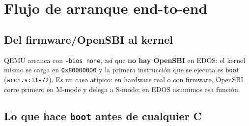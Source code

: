 \documentclass[11pt,a4paper]{article}
\begin{document}
\section{Flujo de arranque end-to-end}

\subsection{Del firmware/OpenSBI al kernel}

QEMU arranca con \texttt{-bios none}, así que \textbf{no hay
OpenSBI} en EDOS: el kernel mismo se carga en \texttt{0x80000000} y
la primera instrucción que se ejecuta es \texttt{boot}
(\texttt{arch.s:11-72}). Es un caso atípico: en hardware real o con
firmware, OpenSBI corre primero en M-mode y delega a S-mode; en
EDOS asumimos esa función.

\subsection{Lo que hace \texttt{boot} antes de cualquier C}
\end{document}
